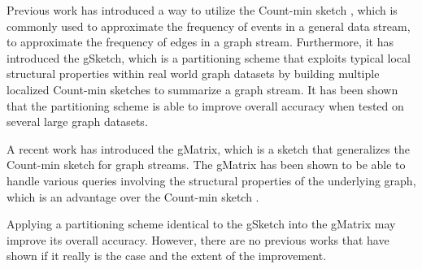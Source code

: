 Previous work \cite{DBLP} has introduced a way to utilize the Count-min sketch \cite{cormode2005improved}, which is commonly used to approximate the frequency of events in a general data stream, to approximate the frequency of edges in a graph stream. Furthermore, it \cite{DBLP} has introduced the gSketch, which is a partitioning scheme that exploits typical local structural properties within real world graph datasets by building multiple localized Count-min sketches \cite{cormode2005improved} to summarize a graph stream. It has been shown that the partitioning scheme is able to improve overall accuracy when tested on several large graph datasets.

A recent work \cite{khan} has introduced the gMatrix, which is a sketch that generalizes the Count-min sketch for graph streams. The gMatrix has been shown to be able to handle various queries involving the structural properties of the underlying graph, which is an advantage over the Count-min sketch \cite{DBLP}.

Applying a partitioning scheme identical to the gSketch \cite{DBLP} into the gMatrix \cite{khan} may improve its overall accuracy. However, there are no previous works that have shown if it really is the case and the extent of the improvement.

